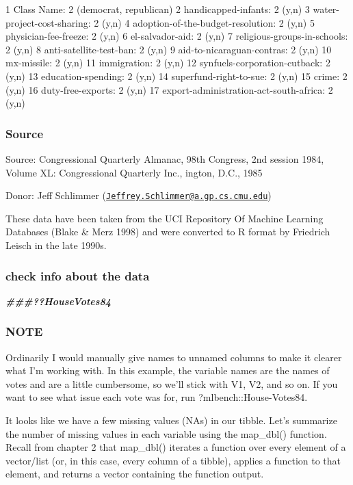 \documentclass[
]{article}
\newenvironment{Shaded}{\begin{snugshade}}{\end{snugshade}}
\newcommand{\DocumentationTok}[1]{\textcolor[rgb]{0.56,0.35,0.01}{\textbf{\textit{#1}}}}
\begin{document}
1 Class Name: 2 (democrat, republican) 2 handicapped-infants: 2 (y,n) 3
water-project-cost-sharing: 2 (y,n) 4 adoption-of-the-budget-resolution:
2 (y,n) 5 physician-fee-freeze: 2 (y,n) 6 el-salvador-aid: 2 (y,n) 7
religious-groups-in-schools: 2 (y,n) 8 anti-satellite-test-ban: 2 (y,n)
9 aid-to-nicaraguan-contras: 2 (y,n) 10 mx-missile: 2 (y,n) 11
immigration: 2 (y,n) 12 synfuels-corporation-cutback: 2 (y,n) 13
education-spending: 2 (y,n) 14 superfund-right-to-sue: 2 (y,n) 15 crime:
2 (y,n) 16 duty-free-exports: 2 (y,n) 17
export-administration-act-south-africa: 2 (y,n)

\subsubsection{Source}\label{source}

Source: Congressional Quarterly Almanac, 98th Congress, 2nd session
1984, Volume XL: Congressional Quarterly Inc., ington, D.C., 1985

Donor: Jeff Schlimmer
(\href{mailto:Jeffrey.Schlimmer@a.gp.cs.cmu.edu}{\nolinkurl{Jeffrey.Schlimmer@a.gp.cs.cmu.edu}})

These data have been taken from the UCI Repository Of Machine Learning
Databases (Blake \& Merz 1998) and were converted to R format by
Friedrich Leisch in the late 1990s.

\subsubsection{check info about the
data}\label{check-info-about-the-data}

\begin{Shaded}
\begin{Highlighting}[]
\DocumentationTok{\#\#\#??HouseVotes84}
\end{Highlighting}
\end{Shaded}

\subsubsection{NOTE}\label{note-11}

Ordinarily I would manually give names to unnamed columns to make it
clearer what I'm working with. In this example, the variable names are
the names of votes and are a little cumbersome, so we'll stick with V1,
V2, and so on. If you want to see what issue each vote was for, run
?mlbench::House-Votes84.

It looks like we have a few missing values (NAs) in our tibble. Let's
summarize the number of missing values in each variable using the
map\_dbl() function. Recall from chapter 2 that map\_dbl() iterates a
function over every element of a vector/list (or, in this case, every
column of a tibble), applies a function to that element, and returns a
vector containing the function output.
\end{document}
